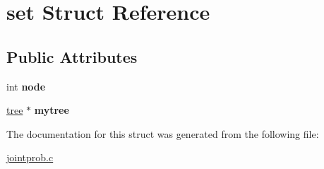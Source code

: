 \hypertarget{structset}{
\section{set Struct Reference}
\label{structset}
}
\subsection*{Public Attributes}
\begin{DoxyCompactItemize}
\item 
\hypertarget{structset_aad5f13f39f724507f93c6957760052af}{
int {\bfseries node}}
\label{structset_aad5f13f39f724507f93c6957760052af}

\item 
\hypertarget{structset_a9756231029a45cab598cdfe86268daec}{
\hyperlink{structtreestruct}{tree} $\ast$ {\bfseries mytree}}
\label{structset_a9756231029a45cab598cdfe86268daec}

\end{DoxyCompactItemize}


The documentation for this struct was generated from the following file:\begin{DoxyCompactItemize}
\item 
\hyperlink{jointprob_8c}{jointprob.c}\end{DoxyCompactItemize}
